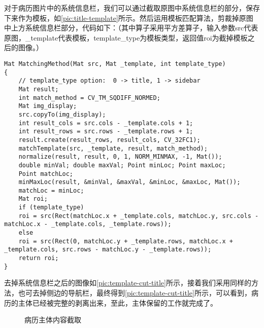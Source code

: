 对于病历图片中的系统信息栏，我们可以通过截取原图中系统信息栏的部分，保存下来作为模板，如\autoref{pic:title-template}所示。然后运用模板匹配算法，剪裁掉原图中上方系统信息栏部分，代码如下：（其中算子采用平方差算子，输入参数src代表原图，\_template代表模板，template\_type为模板类型，返回值roi为截掉模板之后的图像。）
\begin{lstlisting}
Mat MatchingMethod(Mat src, Mat _template, int template_type)
{
	// template_type option:  0 -> title, 1 -> sidebar
	Mat result;
	int match_method = CV_TM_SQDIFF_NORMED;
	Mat img_display;
	src.copyTo(img_display);
	int result_cols = src.cols - _template.cols + 1;
	int result_rows = src.rows - _template.rows + 1;
	result.create(result_rows, result_cols, CV_32FC1);
	matchTemplate(src, _template, result, match_method);
	normalize(result, result, 0, 1, NORM_MINMAX, -1, Mat());
	double minVal; double maxVal; Point minLoc; Point maxLoc;
	Point matchLoc;
	minMaxLoc(result, &minVal, &maxVal, &minLoc, &maxLoc, Mat());
	matchLoc = minLoc;
	Mat roi;
	if (template_type)
	roi = src(Rect(matchLoc.x + _template.cols, matchLoc.y, src.cols - matchLoc.x - _template.cols, _template.rows));
	else
	roi = src(Rect(0, matchLoc.y + _template.rows, matchLoc.x + _template.cols, src.rows - matchLoc.y - _template.rows));
	return roi;
}
\end{lstlisting}

去掉系统信息栏之后的图像如\autoref{pic:template-cut-title}所示，接着我们采用同样的方法，也可去掉侧边的导航栏，最终得到\autoref{pic:template-cut-title}所示，可以看到，病历的主体已经被完整的剥离出来，至此，主体保留的工作就完成了。

\begin{figure}[htbp]
  \centering
  \caption{病历主体内容截取}
  \label{pic:different-layout}
\end{figure}

